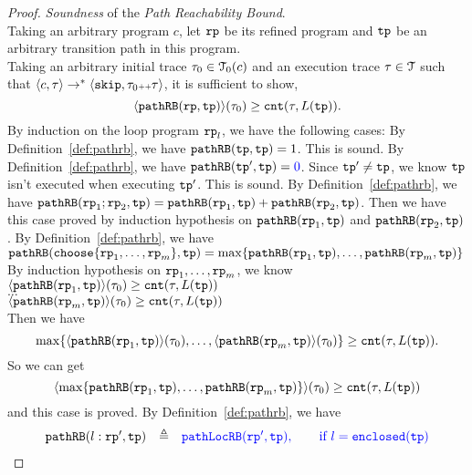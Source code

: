 \begin{proof}
\emph{Soundness} of the \emph{Path Reachability Bound}.
  \\
  Taking an arbitrary program $c$, let $\mathtt{rp}$ be its refined program and $\mathtt{tp}$ be an arbitrary transition path in this program.
  \\
Taking an arbitrary initial trace $\mathtt{\tau}_0 \in \mathcal{T}_0(c)$  and an execution trace $\mathtt{\tau} \in \mathcal{T}$
 such that $\langle {c}, \mathtt{\tau} \rangle \to^{*} \langle \mathtt{skip}, \mathtt{\tau}_0 {\scriptscriptstyle ++} \mathtt{\tau} \rangle$,
 it is sufficient to show,
 \[
 \langle \mathtt{pathRB}(\mathtt{rp}, \mathtt{tp}) \rangle(\mathtt{\tau}_0) \geq \mathtt{cnt}(\mathtt{\tau}, L(\mathtt{tp})) .
 \]
By induction on the loop program $\mathtt{rp}_l$, we have the following cases:
By Definition~\ref{def:pathrb}, we have $\mathtt{pathRB}(\mathtt{tp}, \mathtt{tp}) = 1$.
This is sound.
By Definition~\ref{def:pathrb}, we have $\inoutB(\tpath', \tpath) = \highlight{0}$.
Since $\mathtt{tp}' \neq \mathtt{tp}$, we know $\mathtt{tp}$ isn't executed when executing $\mathtt{tp}'$. This is sound.
By Definition~\ref{def:pathrb}, we have $\mathtt{pathRB}(\mathtt{rp}_1;\mathtt{rp}_2, \mathtt{tp}) = \mathtt{pathRB}(\mathtt{rp}_1, \mathtt{tp}) + \mathtt{pathRB}(\mathtt{rp}_2, \mathtt{tp}) $.
Then we have this case proved by induction hypothesis on $\mathtt{pathRB}(\mathtt{rp}_1, \mathtt{tp})$ and $\mathtt{pathRB}(\mathtt{rp}_2, \mathtt{tp}) $.
By Definition~\ref{def:pathrb}, we have $\inoutB(\rpchoose{\rprog_1, \ldots, \rprog_m }, \tpath) = 
\max\left\{ \inoutB(\rprog_1, \tpath), \ldots, \inoutB(\rprog_m, \tpath) \right\}$ 
By induction hypothesis on $\mathtt{rp}_1, \ldots, \mathtt{rp}_m$,
we know 
\\
$\langle \mathtt{pathRB}(\mathtt{rp}_1, \mathtt{tp}) \rangle(\mathtt{\tau}_0) \geq \mathtt{cnt}(\mathtt{\tau}, L(\mathtt{tp})) $
\\
$\ldots$
\\
$\langle \mathtt{pathRB}(\mathtt{rp}_m, \mathtt{tp}) \rangle(\mathtt{\tau}_0) \geq \mathtt{cnt}(\mathtt{\tau}, L(\mathtt{tp})) $
\\
Then we have 
\[
  \max\left\{\config{\inoutB(\rprog_1, \tpath)}(\trace_0), \ldots, \config{\inoutB(\rprog_m, \tpath)}(\trace_0) \right\}
  \geq \counter(\vtrace, L(\tpath)).
\]
So we can get 
\[
  \config{\max\left\{\inoutB(\rprog_1, \tpath), \ldots, \inoutB(\rprog_m, \tpath) \right\}}(\trace_0)
  \geq \counter(\vtrace, L(\tpath))
\]
and this case is proved.
By Definition~\ref{def:pathrb}, we have 
\[  
  \begin{array}{rcl}
    \inoutB(l: \rprog', \tpath) & \triangleq & 
\highlight{\outinB(\rprog', \tpath), \qquad \text{if } l = \kw{enclosed}(\tpath)}

\end{array}\]
\end{proof}
